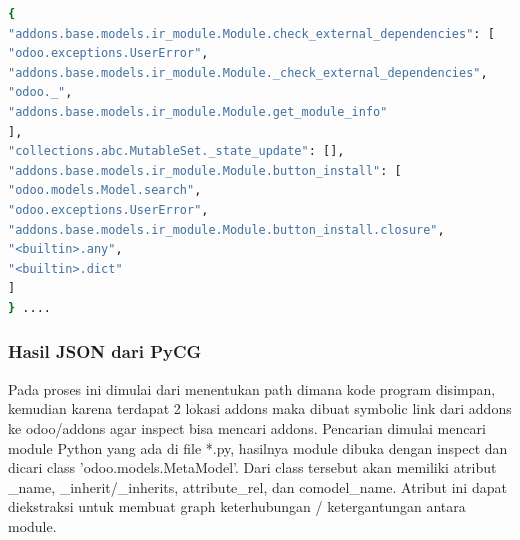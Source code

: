 \begin{lstlisting}[style=mystyle, language=sh, caption={Shell Script untuk pembuatan call graph}]
{
"addons.base.models.ir_module.Module.check_external_dependencies": [
"odoo.exceptions.UserError",
"addons.base.models.ir_module.Module._check_external_dependencies",
"odoo._",
"addons.base.models.ir_module.Module.get_module_info"
],
"collections.abc.MutableSet._state_update": [],
"addons.base.models.ir_module.Module.button_install": [
"odoo.models.Model.search",
"odoo.exceptions.UserError",
"addons.base.models.ir_module.Module.button_install.closure",
"<builtin>.any",
"<builtin>.dict"
]
} ....
\end{lstlisting}


\subsubsection{Hasil JSON dari PyCG}
Pada proses ini dimulai dari menentukan path dimana kode program disimpan, kemudian karena terdapat 2 lokasi addons maka dibuat symbolic link dari addons ke odoo/addons agar inspect bisa mencari addons. Pencarian dimulai mencari module Python yang ada di file *.py, hasilnya module dibuka dengan inspect dan dicari class 'odoo.models.MetaModel'. Dari class tersebut akan memiliki atribut {\_}name, {\_}inherit/{\_}inherits, attribute{\_}rel, dan comodel{\_}name. Atribut ini dapat diekstraksi untuk membuat graph keterhubungan / ketergantungan antara module.

